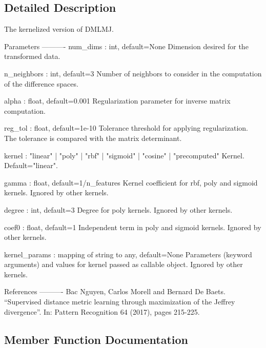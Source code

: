 \subsection{Detailed Description}
\begin{DoxyVerb}The kernelized version of DMLMJ.

Parameters
----------
num_dims : int, default=None
    Dimension desired for the transformed data.

n_neighbors : int, default=3
    Number of neighbors to consider in the computation of the difference spaces.

alpha : float, default=0.001
    Regularization parameter for inverse matrix computation.

reg_tol : float, default=1e-10
    Tolerance threshold for applying regularization. The tolerance is compared with the matrix determinant.

kernel : "linear" | "poly" | "rbf" | "sigmoid" | "cosine" | "precomputed"
    Kernel. Default="linear".

gamma : float, default=1/n_features
    Kernel coefficient for rbf, poly and sigmoid kernels. Ignored by other
    kernels.

degree : int, default=3
    Degree for poly kernels. Ignored by other kernels.

coef0 : float, default=1
    Independent term in poly and sigmoid kernels.
    Ignored by other kernels.

kernel_params : mapping of string to any, default=None
    Parameters (keyword arguments) and values for kernel passed as
    callable object. Ignored by other kernels.

References
----------
    Bac Nguyen, Carlos Morell and Bernard De Baets. “Supervised distance metric learning through
    maximization of the Jeffrey divergence”. In: Pattern Recognition 64 (2017), pages 215-225.
\end{DoxyVerb}
 

\subsection{Member Function Documentation}
